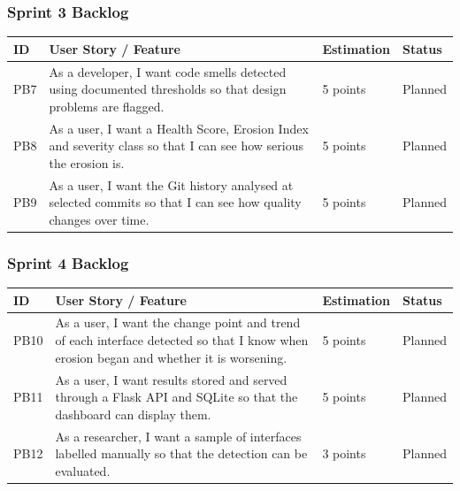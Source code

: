 \documentclass[12pt,a4paper]{article}
\begin{document}
\subsubsection{Sprint 3 Backlog}

\begin{table}[H]
\centering
\renewcommand{\arraystretch}{1.4}
\setlength{\tabcolsep}{4pt}

\begin{tabular}{|L{0.45in}|L{3.0in}|L{0.85in}|L{0.75in}|}
\hline
\textbf{ID} & \textbf{User Story / Feature} & \textbf{Estimation} & \textbf{Status} \\
\hline
PB7 & As a developer, I want code smells detected using documented thresholds so that design problems are flagged. & 5 points & Planned \\
\hline
PB8 & As a user, I want a Health Score, Erosion Index and severity class so that I can see how serious the erosion is. & 5 points & Planned \\
\hline
PB9 & As a user, I want the Git history analysed at selected commits so that I can see how quality changes over time. & 5 points & Planned \\
\hline
\end{tabular}
\end{table}

\subsubsection{Sprint 4 Backlog}

\begin{table}[H]
\centering
\renewcommand{\arraystretch}{1.4}
\setlength{\tabcolsep}{4pt}

\begin{tabular}{|L{0.45in}|L{3.0in}|L{0.85in}|L{0.75in}|}
\hline
\textbf{ID} & \textbf{User Story / Feature} & \textbf{Estimation} & \textbf{Status} \\
\hline
PB10 & As a user, I want the change point and trend of each interface detected so that I know when erosion began and whether it is worsening. & 5 points & Planned \\
\hline
PB11 & As a user, I want results stored and served through a Flask API and SQLite so that the dashboard can display them. & 5 points & Planned \\
\hline
PB12 & As a researcher, I want a sample of interfaces labelled manually so that the detection can be evaluated. & 3 points & Planned \\
\hline
\end{tabular}
\end{table}
\end{document}
